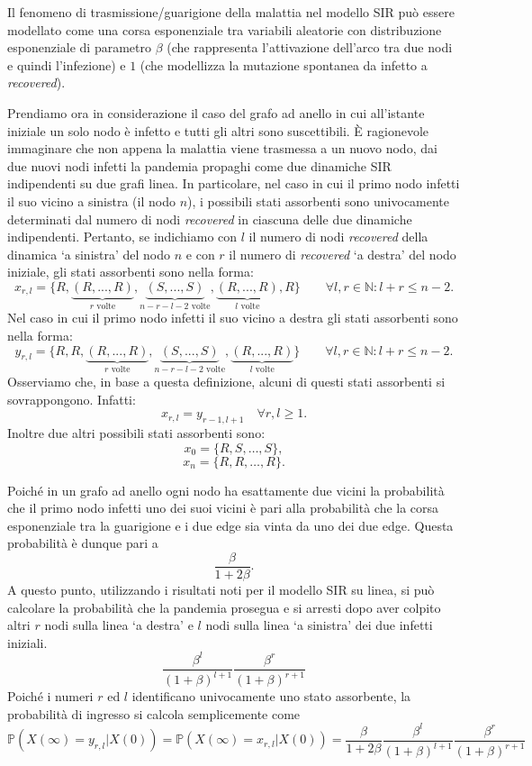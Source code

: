 
Il fenomeno di trasmissione/guarigione della malattia nel modello SIR può essere modellato come una corsa esponenziale tra variabili aleatorie con distribuzione esponenziale di parametro $\beta$ (che rappresenta l'attivazione dell'arco tra due nodi e quindi l'infezione) e $1$ (che modellizza la mutazione spontanea da infetto a \textit{recovered}).

Prendiamo ora in considerazione il caso del grafo ad anello in cui all'istante iniziale un solo nodo è infetto e tutti gli altri sono suscettibili.
È ragionevole immaginare che non appena la malattia viene trasmessa a un nuovo nodo, dai due nuovi nodi infetti la pandemia propaghi come due dinamiche SIR indipendenti su due grafi linea.
In particolare, nel caso in cui il primo nodo infetti il suo vicino a sinistra (il nodo $n$), i possibili stati assorbenti sono univocamente determinati dal numero di nodi \textit{recovered} in ciascuna delle due dinamiche indipendenti. 
Pertanto, se indichiamo con $l$ il numero di nodi \textit{recovered} della dinamica `a sinistra' del nodo $n$ e con $r$ il numero di \textit{recovered}  `a destra' del nodo iniziale, gli stati assorbenti sono nella forma:
\[
x_{r,l} = \{ R,  \underbrace{(R,...,R)}_{r \text{ volte}},  \underbrace{(S,...,S)}_{n-r-l-2 \text{ volte}},  \underbrace{(R,...,R)}_{l \text{ volte}}, R \} \quad \quad \forall l,r \in \mathbb{N}: l+r \leq n-2.
 \]
Nel caso in cui il primo nodo infetti il suo vicino a destra gli stati assorbenti sono nella forma: 
\[
y_{r,l} = \{ R,R,  \underbrace{(R,...,R)}_{r \text{ volte}},  \underbrace{(S,...,S)}_{n-r-l-2 \text{ volte}},  \underbrace{(R,...,R)}_{l \text{ volte}} \} \quad \quad \forall l,r \in \mathbb{N}: l+r \leq n-2.
 \]
Osserviamo che, in base a questa definizione, alcuni di questi stati assorbenti si sovrappongono. Infatti:
\[
x_{r,l} = y_{r- 1, l + 1} \quad \forall r,l \geq 1.     
\]
 Inoltre due altri possibili stati assorbenti sono:
 \[
 x_0 = \{ R, S, \dots , S\},
 \]
 \[
 x_n = \{R,R, \dots , R\} .       
 \]

Poiché in un grafo ad anello ogni nodo ha esattamente due vicini la probabilità che il primo nodo infetti uno dei suoi vicini è pari alla probabilità che la corsa esponenziale tra la guarigione e i due edge sia vinta da uno dei due edge.
Questa probabilità è dunque pari a
    \[
	\frac{\beta}{1+2\beta}.
        \]
A questo punto, utilizzando i risultati noti per il modello SIR su linea, si può calcolare la probabilità che la pandemia prosegua e si arresti dopo aver colpito altri $r$ nodi sulla linea `a destra' e $l$ nodi sulla linea `a sinistra' dei due infetti iniziali.
    \[
	\frac{\beta^l}{(1+\beta)^{l+1}}\frac{\beta^r}{(1+\beta)^{r+1}}
        \]
Poiché i numeri $r$ ed $l$ identificano univocamente uno stato assorbente, la probabilità di ingresso si calcola semplicemente come
 \[
	\mathbb{P}(X(\infty)=y_{r,l} | X(0))  =\mathbb{P}(X(\infty)=x_{r,l} | X(0))  =\frac{\beta}{1+2\beta}\frac{\beta^l}{(1+\beta)^{l+1}}\frac{\beta^r}{(1+\beta)^{r+1}}
        \]
       
